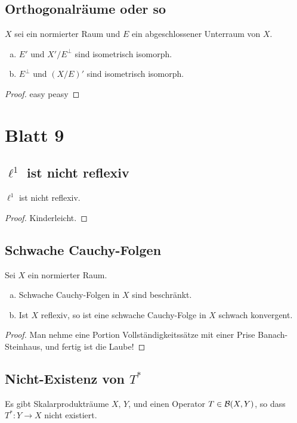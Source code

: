 \documentclass[FunkAnaskriptSS2017.tex]{subfiles}
\begin{document}
\subsection{ Orthogonalräume oder so}
\label{B8.4}
	$X$ sei ein normierter Raum und $E$ ein abgeschlossener Unterraum von $X$.
	\begin{enumerate}[(a)]
		\item $E'$ und $X'/E^\perp$ sind isometrisch isomorph.
		\item $E^\perp$ und $(X/E)'$ sind isometrisch isomorph.
	\end{enumerate}
	
	\begin{proof}
	easy peasy
	\end{proof}


\newpage 
\section{ Blatt 9}

\subsection{ $\ell^1$ ist nicht reflexiv}
\label{B9.1}
	$\ell^1$ ist nicht reflexiv.
	
	\begin{proof}
	Kinderleicht.
	\end{proof}


\subsection{ Schwache Cauchy-Folgen}
\label{B9.2}
	Sei $X$ ein normierter Raum.
	\begin{enumerate}[(a)]
	\item Schwache Cauchy-Folgen in $X$ sind beschränkt.
	\item Ist $X$ reflexiv, so ist eine schwache Cauchy-Folge in $X$ schwach konvergent.	
	\end{enumerate}	 

	\begin{proof}
	Man nehme eine Portion Vollständigkeitssätze mit einer Prise Banach-Steinhaus, und fertig ist die Laube!
	\end{proof}
	
\subsection{ Nicht-Existenz von $T^*$}
\label{B9.3}
	Es gibt Skalarprodukträume $X,\,Y$, und einen Operator $T\in \mathcal{B}(X,Y)$, so dass $T^* : Y \to X$ nicht existiert.
	
\end{document}
